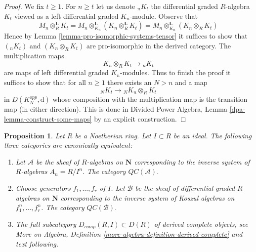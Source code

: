 \documentclass{stacks-project}
\theoremstyle{plain}
\newtheorem{proposition}[subsection]{Proposition}
\theoremstyle{definition}
\theoremstyle{remark}
\numberwithin{equation}{subsection}
\begin{document}
\begin{proof}
We fix $t \geq 1$. For $n \geq t$ let us denote ${}_nK_t$
the differential graded $R$-algebra $K_t$ viewed as a left differential graded
$K_n$-module. Observe that
$$
M_n \otimes_R^\mathbf{L} K_t =
M_n \otimes_{K_n}^\mathbf{L} (K_n \otimes_R^\mathbf{L} K_t) =
M_n \otimes_{K_n}^\mathbf{L} (K_n \otimes_R K_t)
$$
Hence by Lemma \ref{lemma-pro-isomorphic-systems-tensor}
it suffices to show that
$({}_nK_t)$ and $(K_n \otimes_R K_t)$ are pro-isomorphic in the
derived category. The multiplication maps
$$
K_n \otimes_R K_t \longrightarrow {}_nK_t
$$
are maps of left differential graded $K_n$-modules. Thus to finish the proof
it suffices to show that for all $n \geq 1$ there exists an $N > n$
and a map
$$
{}_NK_t \longrightarrow {}_NK_n \otimes_R K_t
$$
in $D(K_N^{opp}, \text{d})$ whose composition with the multiplication
map is the transition map (in either direction). This is done in
Divided Power Algebra, Lemma \ref{dpa-lemma-construct-some-maps}
by an explicit construction.
\end{proof}

\begin{proposition}
\label{proposition-derived-complete}
Let $R$ be a Noetherian ring. Let $I \subset R$ be an ideal.
The following three categories are canonically equivalent:
\begin{enumerate}
\item Let $\mathcal{A}$ be the sheaf of $R$-algebras on $\mathbf{N}$
corresponding to the inverse system of $R$-algebras $A_n = R/I^n$.
The category $\mathit{QC}(\mathcal{A})$.
\item Choose generators $f_1, \ldots, f_r$ of $I$. Let
$\mathcal{B}$ be the sheaf of differential graded $R$-algebras
on $\mathbf{N}$ corresponding to the inverse system of
Koszul algebras on $f_1^n, \ldots, f_r^n$.
The category $\mathit{QC}(\mathcal{B})$.
\item The full subcategory $D_{comp}(R, I) \subset D(R)$
of derived complete objects, see More on Algebra, Definition
\ref{more-algebra-definition-derived-complete} and text following.
\end{enumerate}
\end{proposition}
\end{document}
